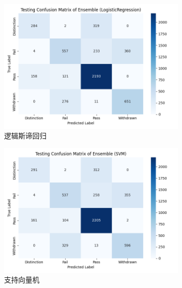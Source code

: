 \documentclass[a4paper, utf8]{ctexart}
\begin{document}
	\begin{figure}
		\centering
		\begin{subfigure}{.32\textwidth}
			\centering
			\includegraphics[width=\textwidth]{./figure/test_ensem_lr.png}
			\caption{逻辑斯谛回归}
		\end{subfigure}
		\begin{subfigure}{.32\textwidth}
			\centering
			\includegraphics[width=\textwidth]{./figure/test_ensem_svm.png}
			\caption{支持向量机}
		\end{subfigure}
		\begin{subfigure}{.32\textwidth}
			\centering

\end{subfigure}
\end{figure}
\end{document}
